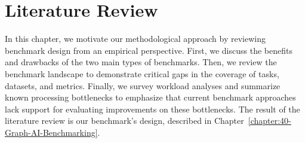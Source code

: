 \renewcommand{\thechapter}{3}
\chapter{Literature Review}
\label{chapter:30-Literature-Review}

In this chapter, we motivate our methodological approach by reviewing benchmark design from an empirical perspective.
First, we discuss the benefits and drawbacks of the two main types of benchmarks.
Then, we review the \gai benchmark landscape to demonstrate critical gaps in the coverage of \gai tasks, datasets, and metrics.
Finally, we survey workload analyses and summarize known \gai processing bottlenecks to emphasize that current benchmark approaches lack support for evaluating improvements on these bottlenecks.
The result of the literature review is our benchmark's design, described in Chapter~\ref{chapter:40-Graph-AI-Benchmarking}.




